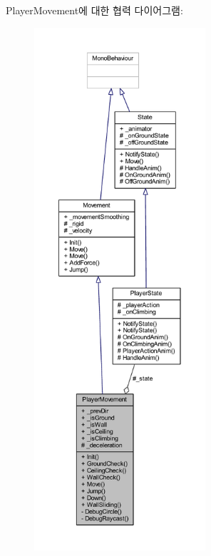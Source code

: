 Player\+Movement에 대한 협력 다이어그램\+:\nopagebreak
\begin{figure}[H]
\begin{center}
\leavevmode
\includegraphics[height=550pt]{d5/df4/class_player_movement__coll__graph}
\end{center}
\end{figure}
